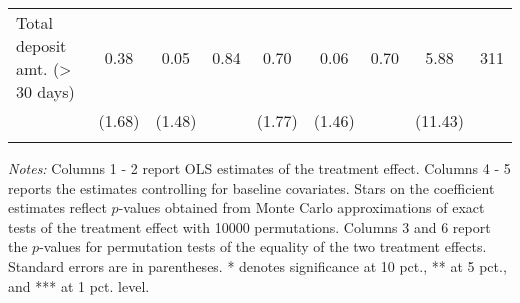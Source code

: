 \begin{table}[htbp]
{\begin{threeparttable}
\begin{tabular}{l*{8}{c}}
Total deposit amt. (> 30 days)&     0.38&     0.05&     0.84&     0.70&     0.06&     0.70&     5.88&      311\\
          &   (1.68)&   (1.48)&         &   (1.77)&   (1.46)&         &  (11.43)&         \\
          &         &         &         &         &         &         &         &         \\
\bottomrule \end{tabular} \begin{tablenotes}[flushleft] \footnotesize \item \emph{Notes:} Columns 1 - 2 report OLS estimates of the treatment effect. Columns 4 - 5 reports the estimates controlling for baseline covariates. Stars on the coefficient estimates reflect \(p\)-values obtained from Monte Carlo approximations of exact tests of the treatment effect with 10000 permutations. Columns 3 and 6 report the \(p\)-values for permutation tests of the equality of the two treatment effects. Standard errors are in parentheses. * denotes significance at 10 pct., ** at 5 pct., and *** at 1 pct. level. \end{tablenotes} \end{threeparttable} } \end{table}

